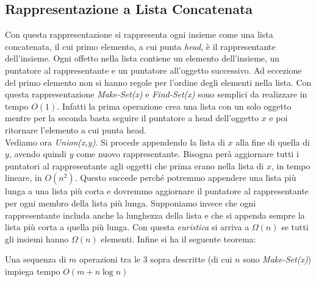 \documentclass[a4paper,12pt, oneside]{book}
\begin{document}
\subsection{Rappresentazione a Lista Concatenata}
Con questa rappresentazione si rappresenta ogni insieme come una lista
concatenata, il cui primo elemento, a cui punta \textit{head},
è il rappresentante dell'insieme. Ogni offetto nella lista contiene
un elemento dell'insieme, un puntatore al rappresentante
e un puntatore all'oggetto successivo. Ad eccezione del primo
elemento non si hanno regole per l'ordine degli
elementi nella lista. Con questa rappresentazione
\textit{Make-Set(x)} e \textit{Find-Set(x)} sono semplici da
realizzare in tempo $O(1)$. Infatti la prima operazione crea una
lista con un solo oggetto mentre per la seconda basta seguire il
puntatore a head dell’oggetto $x$ e poi ritornare l’elemento a cui
punta head. \\
Vediamo ora \textit{Union(x,y)}. Si procede appendendo la lista di $x$
alla fine di quella di $y$, avendo quindi $y$ come nuovo
rappresentante. Bisogna perà aggiornare tutti i puntatori al
rappresentante agli oggetti che prima erano nella lista di $x$, in
tempo lineare, in $O(n^2)$. Questo succede perché potremmo appendere
una lista più lunga a una lista più corta e dovremmo aggiornare
il puntatore al rappresentante per ogni membro
della lista più lunga. Supponiamo invece che ogni rappresentante
includa anche la lunghezza della lista e che si appenda sempre la
lista più corta a quella più lunga. Con questa \textit{euristica} si
arriva a $\Omega(n)$ se tutti gli insiemi hanno $\Omega(n)$
elementi. Infine si ha il seguente teorema:
\begin{teorema}
  Una sequenza di $m$ operazioni tra le 3 sopra descritte (di cui $n$
  sono \textit{Make-Set(x)}) impiega tempo $O(m+n\log n)$
\end{teorema}
\end{document}
